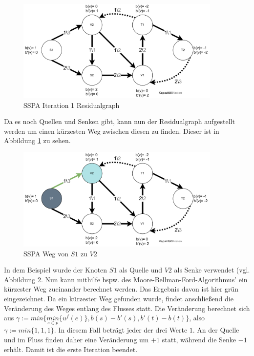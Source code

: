 \begin{figure}[H]
\centering
\includegraphics[width=0.9\textwidth]{img/anton/sspa-Step1-residual.pdf}
\caption{SSPA Iteration 1 Residualgraph}
\label{fig:sspa_step1-residual}
\end{figure}
Da es noch Quellen und Senken gibt, kann nun der Residualgraph aufgestellt werden um einen kürzesten Weg zwischen diesen zu finden. Dieser ist in Abbildung \ref{fig:sspa_step1-residual} zu sehen.

\begin{figure}[H]
\centering
\includegraphics[width=0.9\textwidth]{img/anton/sspa-Step1-shortestPath.pdf}
\caption{SSPA Weg von $S1$ zu $V2$}
\label{fig:sspa_step1-shortestPath}
\end{figure}

In dem Beispiel wurde der Knoten $S1$ als Quelle und $V2$ als Senke verwendet (vgl. Abbildung \ref{fig:sspa_step1-shortestPath}. Nun kann mithilfe bspw. des Moore-Bellman-Ford-Algorithmus' ein kürzester Weg zueinander berechnet werden. Das Ergebnis davon ist hier grün eingezeichnet. Da ein kürzester Weg gefunden wurde, findet anschließend die Veränderung des Weges entlang des Flusses statt. Die Veränderung berechnet sich aus $\gamma := min\{\underset{e \in p}{min} \{u^f (e) \}, b(s) - b'(s), b'(t) - b(t)\} $, also $\gamma := min\{1, 1, 1\}$. In diesem Fall beträgt jeder der drei Werte $1$. An der Quelle und im Fluss finden daher eine Veränderung um $+1$ statt, während die Senke $-1$ erhält. Damit ist die erste Iteration beendet.

